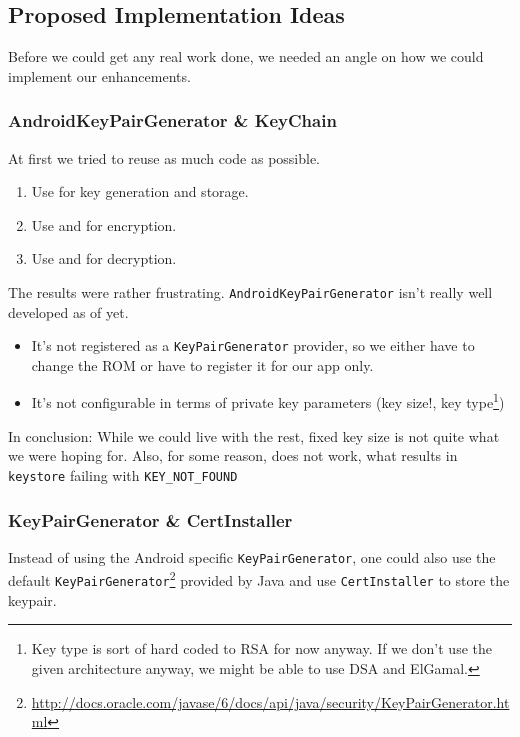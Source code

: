 \documentclass[a4paper]{scrartcl}
\begin{document}
	\subsection{Proposed Implementation Ideas}
		Before we could get any real work done, we needed an angle on how we could implement our enhancements.
		\subsubsection{AndroidKeyPairGenerator \& KeyChain}
			At first we tried to reuse as much code as possible.		
			\begin{enumerate}
				\item Use  for key generation and storage.
				\item Use  and  for encryption.
				\item Use  and  for decryption.
			\end{enumerate}
			The results were rather frustrating. \texttt{AndroidKeyPairGenerator} isn't really well developed as of yet.
			\begin{itemize}
				\item It's not registered as a \texttt{KeyPairGenerator} provider, so we either have to change the ROM or have to register it for our app only.
				\item It's not configurable in terms of private key parameters (key size!, key type\footnote{Key type is sort of hard coded to RSA for now anyway. If we don't use the given architecture anyway, we might be able to use DSA and ElGamal.})
			\end{itemize}
			In conclusion: While we could live with the rest, fixed key size is not quite what we were hoping for. Also, for some reason,  does not work, what results in \texttt{keystore} failing with \texttt{KEY\_NOT\_FOUND}
		
		\subsubsection{KeyPairGenerator \& CertInstaller}
			Instead of using the Android specific \texttt{KeyPairGenerator}, one could also use the default \texttt{KeyPairGenerator}\footnote{\url{http://docs.oracle.com/javase/6/docs/api/java/security/KeyPairGenerator.html}} provided by Java and use \texttt{CertInstaller} to store the keypair.
			
\end{document}
